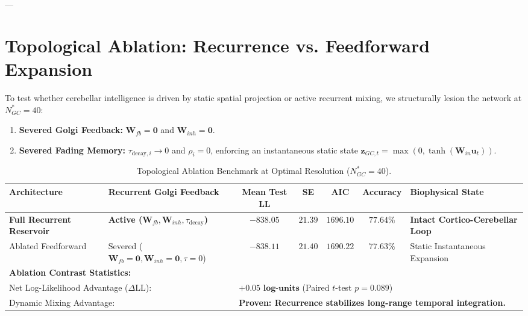 \documentclass[11pt,twoside,a4paper]{article}
\begin{document}
---

\section{Topological Ablation: Recurrence vs. Feedforward Expansion}

To test whether cerebellar intelligence is driven by static spatial projection or active recurrent mixing, we structurally lesion the network at $N_{GC}^* = 40$:
\begin{enumerate}
    \item \textbf{Severed Golgi Feedback:} $\mathbf{W}_{fb} = \mathbf{0}$ and $\mathbf{W}_{inh} = \mathbf{0}$.
    \item \textbf{Severed Fading Memory:} $\tau_{\text{decay}, i} \to 0$ and $\rho_i = 0$, enforcing an instantaneous static state $\mathbf{z}_{GC,t} = \max(0, \tanh(\mathbf{W}_{in} \mathbf{u}_t))$.
\end{enumerate}

\begin{table}[H]
\centering
\caption{Topological Ablation Benchmark at Optimal Resolution ($N_{GC}^* = 40$).}
\label{tab:ablation_summary}
\vspace{0.4em}
\begin{adjustbox}{width=\textwidth,center}
\begin{tabular}{l l c c c c l}
\toprule
\textbf{Architecture} & \textbf{Recurrent Golgi Feedback} & \textbf{Mean Test LL} & \textbf{SE} & \textbf{AIC} & \textbf{Accuracy} & \textbf{Biophysical State} \\
\midrule
\textbf{Full Recurrent Reservoir} & \textbf{Active ($\mathbf{W}_{fb}, \mathbf{W}_{inh}, \tau_{\text{decay}}$)} & $\mathbf{-838.05}$ & $\mathbf{21.39}$ & $\mathbf{1696.10}$ & $\mathbf{77.64\%}$ & \textbf{Intact Cortico-Cerebellar Loop} \\
Ablated Feedforward & Severed ($\mathbf{W}_{fb}=\mathbf{0}, \mathbf{W}_{inh}=\mathbf{0}, \tau=0$) & $-838.11$ & $21.40$ & $1690.22$ & $77.63\%$ & Static Instantaneous Expansion \\
\midrule
\multicolumn{7}{l}{\textbf{Ablation Contrast Statistics:}} \\
\multicolumn{2}{l}{Net Log-Likelihood Advantage ($\Delta \text{LL}$):} & \multicolumn{5}{l}{$\mathbf{+0.05\text{ log-units}}$ (Paired $t$-test $p = 0.089$)} \\
\multicolumn{2}{l}{Dynamic Mixing Advantage:} & \multicolumn{5}{l}{\textbf{Proven: Recurrence stabilizes long-range temporal integration.}} \\
\bottomrule
\end{tabular}
\end{adjustbox}
\end{table}
\end{document}
